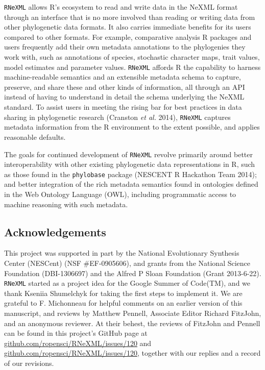 \documentclass[author-year, review, 11pt]{elsarticle} %
\begin{document}
\texttt{RNeXML} allows R's ecosystem to read and write data in the NeXML
format through an interface that is no more involved than reading or
writing data from other phylogenetic data formats. It also carries
immediate benefits for its users compared to other formats. For example,
comparative analysis R packages and users frequently add their own
metadata annotations to the phylogenies they work with, such as
annotations of species, stochastic character maps, trait values, model
estimates and parameter values. \texttt{RNeXML} affords R the capability
to harness machine-readable semantics and an extensible metadata schema
to capture, preserve, and share these and other kinds of information,
all through an API instead of having to understand in detail the schema
underlying the NeXML standard. To assist users in meeting the rising bar
for best practices in data sharing in phylogenetic research (Cranston
\emph{et al.} 2014), \texttt{RNeXML} captures metadata information from
the R environment to the extent possible, and applies reasonable
defaults.

The goals for continued development of \texttt{RNeXML} revolve primarily
around better interoperability with other existing phylogenetic data
representations in R, such as those found in the \texttt{phylobase}
package (NESCENT R Hackathon Team 2014); and better integration of the
rich metadata semantics found in ontologies defined in the Web Ontology
Language (OWL), including programmatic access to machine reasoning with
such metadata.

\subsection{Acknowledgements}\label{acknowledgements}

This project was supported in part by the National Evolutionary
Synthesis Center (NESCent) (NSF \#EF-0905606), and grants from the
National Science Foundation (DBI-1306697) and the Alfred P Sloan
Foundation (Grant 2013-6-22). \texttt{RNeXML} started as a project idea
for the Google Summer of Code(TM), and we thank Kseniia Shumelchyk for
taking the first steps to implement it. We are grateful to F. Michonneau
for helpful comments on an earlier version of this manuscript, and
reviews by Matthew Pennell, Associate Editor Richard FitzJohn, and an
anonymous reviewer. At their behest, the reviews of FitzJohn and Pennell
can be found in this project's GitHub page at
\href{https://github.com/ropensci/RNeXML/issues/121}{github.com/ropensci/RNeXML/issues/120}
and
\href{https://github.com/ropensci/RNeXML/issues/120}{github.com/ropensci/RNeXML/issues/120},
together with our replies and a record of our revisions.
\end{document}
